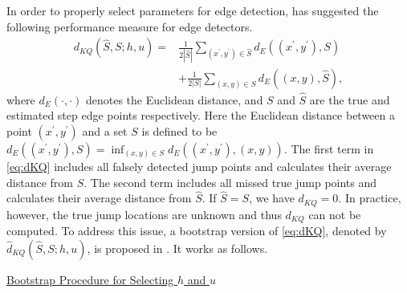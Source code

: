 In order to properly select parameters for edge detection, \citet{kang2014jump} has suggested the following performance measure for edge detectors.
\begin{align}
  d_{KQ}(\widehat{S}, S; h, u) =& \frac{1}{2| \widehat{S} |} \sum_{(x^\prime, y^\prime) \in \widehat{S}} d_E\left((x^\prime, y^\prime), S \right) \nonumber \\
  &+ \frac{1}{2\left| S  \right|} \sum_{(x, y) \in S} d_E\left((x, y), \widehat{S} \right), \label{eq:dKQ}
\end{align}
where \(d_E(\cdot, \cdot)\) denotes the Euclidean distance, and \(S\) and \(\widehat{S}\) are the true and estimated step edge points respectively. Here the Euclidean distance between a point \((x^\prime, y^\prime)\) and a set \(S\) is defined to be \(d_E((x^\prime, y^\prime), S) = \inf_{(x, y) \in S} d_E((x^\prime, y^\prime), (x, y))\). The first term in \eqref{eq:dKQ} includes all falsely detected jump points and calculates their average distance from \(S\). The second term includes all missed true jump points and calculates their average distance from \(\widehat{S}\). If \(\widehat{S} = S\), we have \(d_{KQ} = 0\). In practice, however, the true jump locations are unknown and thus \(d_{KQ}\) can not be computed. To address this issue, a bootstrap version of \eqref{eq:dKQ}, denoted by \(\widehat{d}_{KQ}(\widehat{S}, S; h, u)\), is proposed in \citet{kang2014jump}. It works as follows.

\begin{center}
  \underline{Bootstrap Procedure for Selecting $h$ and $u$}
\end{center}


